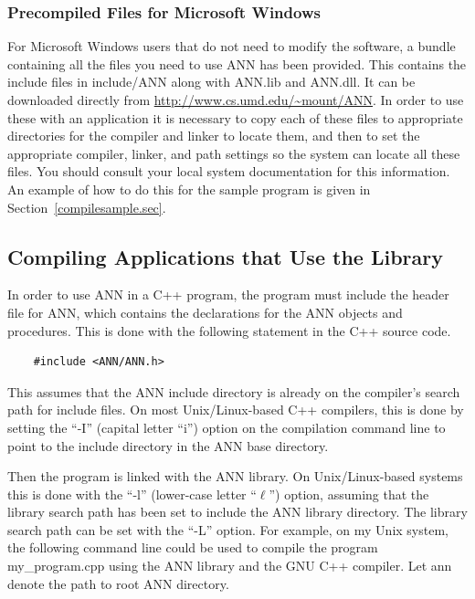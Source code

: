 \documentclass[11pt]{article}		%
\newcommand{\ANN}[0]{\textsf{ANN}}
\begin{document}
\subsubsection{Precompiled Files for Microsoft Windows}

For Microsoft Windows users that do not need to modify the software, a
bundle containing all the files you need to use {\ANN} has been
provided.  This contains the include files in \textsf{include/ANN} along
with \textsf{ANN.lib} and \textsf{ANN.dll}.  It can be downloaded
directly from \url{http://www.cs.umd.edu/~mount/ANN}.  In order to use
these with an application it is necessary to copy each of these files to
appropriate directories for the compiler and linker to locate them, and
then to set the appropriate compiler, linker, and path settings so the
system can locate all these files. You should consult your local system
documentation for this information. An example of how to do this for the
sample program is given in Section~\ref{compilesample.sec}.

\subsection{Compiling Applications that Use the Library}

In order to use {\ANN} in a C++ program, the program must include the
header file for {\ANN}, which contains the declarations for the {\ANN}
objects and procedures.  This is done with the following statement in
the C++ source code.

{\small \begin{verbatim}
    #include <ANN/ANN.h>
\end{verbatim} }

This assumes that the {\ANN} include directory is already on the
compiler's search path for include files.  On most Unix/Linux-based C++
compilers, this is done by setting the ``-I'' (capital letter ``i'')
option on the compilation command line to point to the include directory
in the {\ANN} base directory.

Then the program is linked with the {\ANN} library.  On Unix/Linux-based
systems this is done with the ``\textsf{-l}'' (lower-case letter
``$\ell$'') option, assuming that the library search path has been set
to include the {\ANN} library directory.  The library search path can be
set with the ``\textsf{-L}'' option.   For example, on my Unix system,
the following command line could be used to compile the program
\textsf{my\_program.cpp} using the {\ANN} library and the GNU C++
compiler.  Let \textsf{ann} denote the path to root {\ANN} directory.
\end{document}

